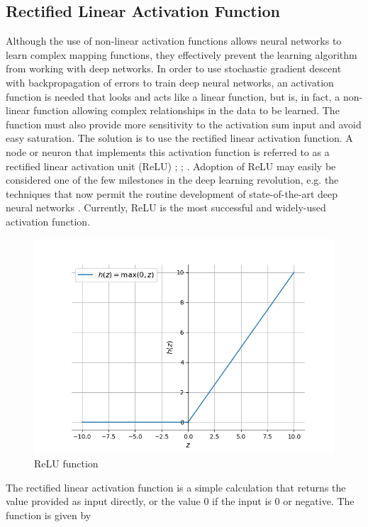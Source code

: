 \documentclass[12pt]{report}
\numberwithin{equation}{section}
\begin{document}
\subsection{Rectified Linear Activation Function}
Although the use of non-linear activation functions allows neural networks to learn complex mapping functions, they effectively prevent the learning algorithm from working with deep networks. In order to use stochastic gradient descent with backpropagation of errors to train deep neural networks, an activation function is needed that looks and acts like a linear function, but is, in fact, a non-linear function allowing complex relationships in the data to be learned. The function must also provide more sensitivity to the activation sum input and avoid easy saturation. The solution is to use the rectified linear activation function. A node or neuron that implements this activation function is referred to as a {rectified linear activation unit} (ReLU) {\cite{Hahnloser}}; {\cite{Jarrett}}; {\cite{10.5555/3104322.3104425}}. Adoption of ReLU may easily be considered one of the few milestones in the deep learning revolution, e.g. the techniques that now permit the routine development of state-of-the-art deep neural networks {\cite{Krizhevsky}}. Currently, ReLU is the most successful and widely-used activation function.
\begin{figure}[htb!]
\centering 
\includegraphics[scale=0.9]{png/relu.png} 
\caption{ReLU function}
\label{fig:relu}
\end{figure}
The rectified linear activation function is a simple calculation that returns the value provided as input directly, or the value $0$ if the input is $0$ or negative. The function is given by 
\end{document}
